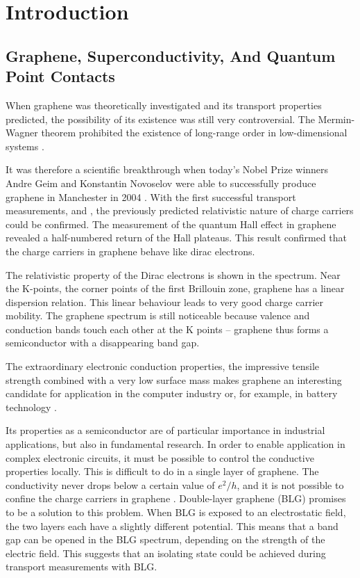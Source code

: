 \chapter{Introduction}
\label{ch:introduction}

\section*{Graphene, Superconductivity, And Quantum Point Contacts}
When graphene was theoretically investigated and its transport properties predicted, the possibility of its existence was still very controversial. The Mermin-Wagner theorem prohibited the existence of long-range order in low-dimensional systems \cite{Mermin1966}.

It was therefore a scientific breakthrough when today's Nobel Prize winners Andre Geim and Konstantin Novoselov were able to successfully produce graphene in Manchester in 2004 \cite{Novoselov2004}. With the first successful transport measurements, \cite{Zhang2005} and \cite{Novoselov2005}, the previously predicted relativistic nature of charge carriers \cite{Semenoff1984} could be confirmed. The measurement of the quantum Hall effect in graphene revealed a half-numbered return of the Hall plateaus. This result confirmed that the charge carriers in graphene behave like dirac electrons.

The relativistic property of the Dirac electrons is shown in the spectrum. Near the K-points, the corner points of the first Brillouin zone, graphene has a linear dispersion relation. This linear behaviour leads to very good charge carrier mobility. The graphene spectrum is still noticeable because valence and conduction bands touch each other at the K points -- graphene thus forms a semiconductor with a disappearing band gap. 

The extraordinary electronic conduction properties, the impressive tensile strength combined with a very low surface mass makes graphene an interesting candidate for application in the computer industry \cite{Jurewicz2014} or, for example, in battery technology \cite{Son2017}.

Its properties as a semiconductor are of particular importance in industrial applications, but also in fundamental research. In order to enable application in complex electronic circuits, it must be possible to control the conductive properties locally. This is difficult to do in a single layer of graphene. The conductivity never drops below a certain value of $e^2/h$, and it is not possible to confine the charge carriers in graphene \cite{Katsnelson2006}. Double-layer graphene (BLG) promises to be a solution to this problem. When BLG is exposed to an electrostatic field, the two layers each have a slightly different potential. This means that a band gap can be opened in the BLG spectrum, depending on the strength of the electric field. This suggests that an isolating state could be achieved during transport measurements with BLG.


